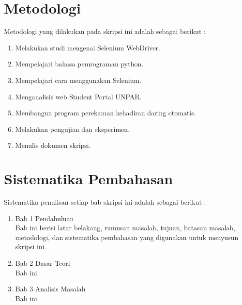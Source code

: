 \section{Metodologi}
\label{sec:metlit}
Metodologi yang dilakukan pada skripsi ini adalah sebagai berikut :
\begin{enumerate}
	\item Melakukan studi mengenai Selenium WebDriver.
	\item Mempelajari bahasa pemrograman python.
	\item Mempelajari cara menggunakan Selenium.
	\item Menganalisis web Student Portal UNPAR.
	\item Membangun program perekaman kehadiran daring otomatis.
	\item Melakukan pengujian dan eksperimen.
	\item Menulis dokumen skripsi.		
\end{enumerate}


\section{Sistematika Pembahasan}
\label{sec:sispem}
Sistematika penulisan setiap bab skripsi ini adalah sebagai berikut :
\begin{enumerate}
	\item Bab 1 Pendahuluan \\
	Bab ini berisi latar belakang, rumusan masalah, tujuan, batasan masalah, metodologi, dan sistematika pembahasan yang digunakan untuk menyusun skripsi ini.
	\item Bab 2 Dasar Teori \\
	Bab ini 
	\item Bab 3 Analisis Masalah \\
	Bab ini

\end{enumerate}
